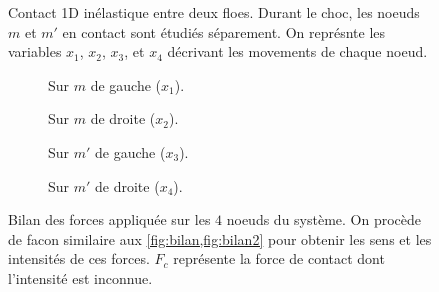 \begin{figure}[!h]
    \centering
    \caption{Contact 1D inélastique entre deux floes. Durant le choc, les noeuds $m$ et $m'$ en contact sont étudiés séparement. On représnte les variables $x_1$, $x_2$, $x_3$, et $x_4$ décrivant les movements de chaque noeud.}
    \label{fig:contact1d3}
\end{figure}


\begin{figure}[!h]
    \begin{subfigure}[b]{0.30\textwidth}
        \centering
        \caption{Sur $m$ de gauche ($x_1$).}
        \label{fig:bilan13}
    \end{subfigure}
    \begin{subfigure}[b]{0.35\textwidth}
        \centering
        \caption{Sur $m$ de droite ($x_2$).}
        \label{fig:bilan23}
    \end{subfigure}
    \begin{subfigure}[b]{0.35\textwidth}
        \centering
        \caption{Sur $m'$ de gauche ($x_3$).}
        \label{fig:bilan33}
    \end{subfigure}
    \begin{subfigure}[b]{0.30\textwidth}
        \centering
        \caption{Sur $m'$ de droite ($x_4$).}
        \label{fig:bilan43}
    \end{subfigure}
       \caption{Bilan des forces appliquée sur les $4$ noeuds du système. On procède de facon similaire aux \cref{fig:bilan,fig:bilan2} pour obtenir les sens et les intensités de ces forces. $F_c$ représente la force de contact dont l'intensité est inconnue.}
       \label{fig:bilan3}
\end{figure}

